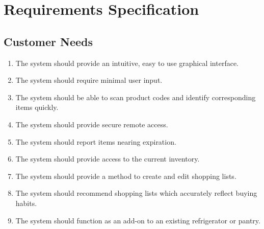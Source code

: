 \documentclass[11pt]{article} %
\begin{document}
\section{Requirements Specification}
\subsection{Customer Needs}
\begin{enumerate}
\item The system should provide an intuitive, easy to use graphical interface.
\item The system should require minimal user input.
\item The system should be able to scan product codes and identify corresponding items quickly.
\item The system should provide secure remote access.
\item The system should report items nearing expiration.
\item The system should provide access to the current inventory.
\item The system should provide a method to create and edit shopping lists.
\item The system should recommend shopping lists which accurately reflect buying habits.
\item The system should function as an add-on to an existing refrigerator or pantry.
\end{enumerate}
\pagebreak
\end{document}
